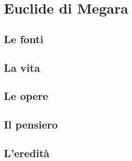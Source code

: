\chapter{Euclide di Megara}

\section{Le fonti}

\section{La vita}

\section{Le opere}

\section{Il pensiero}

\section{L'eredità}
